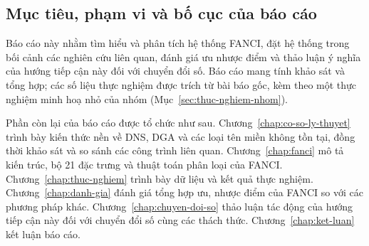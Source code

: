 \subsection{Mục tiêu, phạm vi và bố cục của báo cáo}\label{sec:muc-tieu}

Báo cáo này nhằm tìm hiểu và phân tích hệ thống FANCI, đặt hệ thống trong bối cảnh các nghiên cứu liên quan, đánh giá ưu nhược điểm và thảo luận ý nghĩa của hướng tiếp cận này đối với chuyển đổi số. Báo cáo mang tính khảo sát và tổng hợp; các số liệu thực nghiệm được trích từ bài báo gốc, kèm theo một thực nghiệm minh hoạ nhỏ của nhóm (Mục~\ref{sec:thuc-nghiem-nhom}).

Phần còn lại của báo cáo được tổ chức như sau. Chương~\ref{chap:co-so-ly-thuyet} trình bày kiến thức nền về DNS, DGA và các loại tên miền không tồn tại, đồng thời khảo sát và so sánh các công trình liên quan. Chương~\ref{chap:fanci} mô tả kiến trúc, bộ 21 đặc trưng và thuật toán phân loại của FANCI. Chương~\ref{chap:thuc-nghiem} trình bày dữ liệu và kết quả thực nghiệm. Chương~\ref{chap:danh-gia} đánh giá tổng hợp ưu, nhược điểm của FANCI so với các phương pháp khác. Chương~\ref{chap:chuyen-doi-so} thảo luận tác động của hướng tiếp cận này đối với chuyển đổi số cùng các thách thức. Chương~\ref{chap:ket-luan} kết luận báo cáo.
